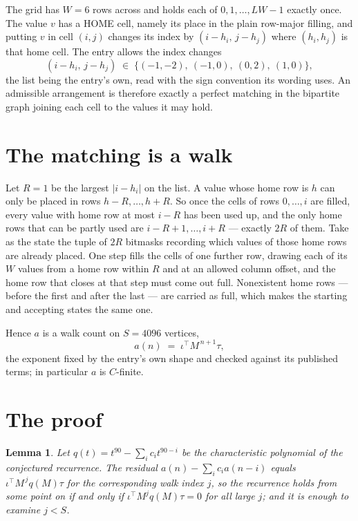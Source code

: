 \documentclass[11pt,a4paper]{article}
\theoremstyle{plain}
\newtheorem{lemma}[theorem]{Lemma}
\theoremstyle{definition}
\begin{document}
The grid has $W=6$ rows across and holds each of $0,1,\dots,LW-1$ exactly once. The value
$v$ has a HOME cell, namely its place in the plain row-major filling, and putting $v$ in cell
$(i,j)$ changes its index by $(i-h_i,\,j-h_j)$ where $(h_i,h_j)$ is that home cell. The entry
allows the index changes
\[
(i-h_i,\,j-h_j)\;\in\;\{(-1,-2),\ (-1,0),\ (0,2),\ (1,0)\},
\]
the list being the entry's own, read with the sign convention its wording uses. An admissible
arrangement is therefore exactly a perfect matching in the bipartite graph joining each cell to
the values it may hold.

\section{The matching is a walk}

Let $R=1$ be the largest $|i-h_i|$ on the list. A value whose home row is $h$ can only be
placed in rows $h-R,\dots,h+R$. So once the cells of rows $0,\dots,i$ are filled, every
value with home row at most $i-R$ has been used up, and the only home rows that can be
partly used are $i-R+1,\dots,i+R$ --- exactly $2R$ of them. Take as the state the tuple of
$2R$ bitmasks recording which values of those home rows are already placed. One step fills
the cells of one further row, drawing each of its $W$ values from a home row within $R$
and at an allowed column offset, and the home row that closes at that step must come out
full. Nonexistent home rows --- before the first and after the last --- are carried as
full, which makes the starting and accepting states the same one.

Hence $a$ is a walk count on $S=4096$ vertices,
\[
a(n)\;=\;\iota^{\!\top}M^{\,n+1}\tau ,
\]
the exponent fixed by the entry's own shape and checked against its published terms; in
particular $a$ is $C$-finite.

\section{The proof}

\begin{lemma}\label{lem:crit}
Let $q(t)=t^{90}-\sum_i c_it^{90-i}$ be the characteristic polynomial of the
conjectured recurrence. The residual $a(n)-\sum_ic_ia(n-i)$ equals
$\iota^{\!\top}M^{\,j}q(M)\tau$ for the corresponding walk index $j$, so the recurrence
holds from some point on if and only if $\iota^{\!\top}M^{j}q(M)\tau=0$ for all large $j$;
and it is enough to examine $j<S$.
\end{lemma}
\end{document}

